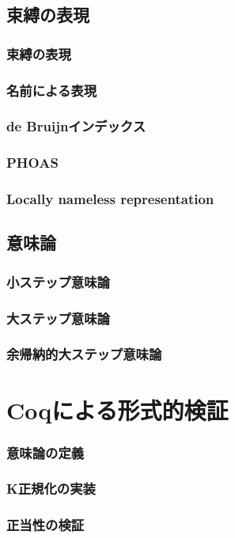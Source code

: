 \documentclass[dvipdfmx,cjk,xcolor=dvipsnames,envcountsect,notheorems,12pt]{beamer}
\theoremstyle{definition}
\begin{document}
\subsection{束縛の表現}

\begin{frame}
	\frametitle{束縛の表現}
\end{frame}

\begin{frame}
	\frametitle{名前による表現}
\end{frame}

\begin{frame}
	\frametitle{de Bruijnインデックス}
\end{frame}

\begin{frame}
	\frametitle{PHOAS}
\end{frame}

\begin{frame}
	\frametitle{Locally nameless representation}
\end{frame}

\subsection{意味論}

\begin{frame}
	\frametitle{小ステップ意味論}
\end{frame}

\begin{frame}
	\frametitle{大ステップ意味論}
\end{frame}

\begin{frame}
	\frametitle{余帰納的大ステップ意味論}
\end{frame}

\section{Coqによる形式的検証}

\begin{frame}
	\frametitle{意味論の定義}
\end{frame}

\begin{frame}
	\frametitle{K正規化の実装}
\end{frame}

\begin{frame}
	\frametitle{正当性の検証}
\end{frame}
\end{document}
